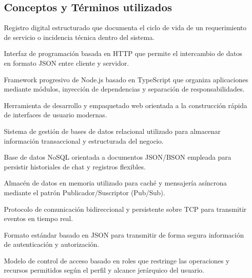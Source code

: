 \subsection{Conceptos y Términos utilizados}

\begin{description}[font=\bfseries, style=nextline, itemsep=0.8em]
 \item[Ticket]
 Registro digital estructurado que documenta el ciclo de vida de un requerimiento de servicio o incidencia técnica dentro del sistema.

 \item[API REST]
 Interfaz de programación basada en HTTP que permite el intercambio de datos en formato JSON entre cliente y servidor.

 \item[NestJS]
 Framework progresivo de Node.js basado en TypeScript que organiza aplicaciones mediante módulos, inyección de dependencias y separación de responsabilidades.

 \item[Vite.js]
 Herramienta de desarrollo y empaquetado web orientada a la construcción rápida de interfaces de usuario modernas.

 \item[MySQL]
 Sistema de gestión de bases de datos relacional utilizado para almacenar información transaccional y estructurada del negocio.

 \item[MongoDB]
 Base de datos NoSQL orientada a documentos JSON/BSON empleada para persistir historiales de chat y registros flexibles.

 \item[Redis]
 Almacén de datos en memoria utilizado para caché y mensajería asíncrona mediante el patrón Publicador/Suscriptor (Pub/Sub).

 \item[WebSockets]
 Protocolo de comunicación bidireccional y persistente sobre TCP para transmitir eventos en tiempo real.

 \item[JWT (JSON Web Token)]
 Formato estándar basado en JSON para transmitir de forma segura información de autenticación y autorización.

 \item[RBAC (Role-Based Access Control)]
 Modelo de control de acceso basado en roles que restringe las operaciones y recursos permitidos según el perfil y alcance jerárquico del usuario.


\end{description}
